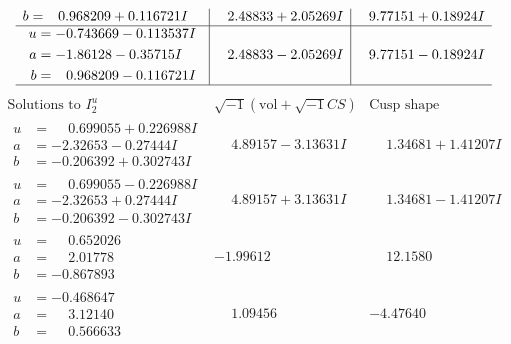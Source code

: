 \documentclass[1p]{elsarticle_modified}
\theoremstyle{definition}
\newcommand{\I}{\sqrt{-1}}
\begin{document}
$$\begin{array}{c|c|c}
\begin{aligned}
b &= \phantom{-}0.968209 + 0.116721 I\end{aligned}
 & \phantom{-}2.48833 + 2.05269 I & \phantom{-}9.77151 + 0.18924 I \\ \hline\begin{aligned}
u &= -0.743669 - 0.113537 I \\
a &= -1.86128 - 0.35715 I \\
b &= \phantom{-}0.968209 - 0.116721 I\end{aligned}
 & \phantom{-}2.48833 - 2.05269 I & \phantom{-}9.77151 - 0.18924 I\\
 \hline 
 \end{array}$$\newpage$$\begin{array}{c|c|c}  
\text{Solutions to }I^u_{2}& \I (\text{vol} + \sqrt{-1}CS) & \text{Cusp shape}\\
 \hline 
\begin{aligned}
u &= \phantom{-}0.699055 + 0.226988 I \\
a &= -2.32653 - 0.27444 I \\
b &= -0.206392 + 0.302743 I\end{aligned}
 & \phantom{-}4.89157 - 3.13631 I & \phantom{-}1.34681 + 1.41207 I \\ \hline\begin{aligned}
u &= \phantom{-}0.699055 - 0.226988 I \\
a &= -2.32653 + 0.27444 I \\
b &= -0.206392 - 0.302743 I\end{aligned}
 & \phantom{-}4.89157 + 3.13631 I & \phantom{-}1.34681 - 1.41207 I \\ \hline\begin{aligned}
u &= \phantom{-}0.652026\phantom{ +0.000000I} \\
a &= \phantom{-}2.01778\phantom{ +0.000000I} \\
b &= -0.867893\phantom{ +0.000000I}\end{aligned}
 & -1.99612\phantom{ +0.000000I} & \phantom{-}12.1580\phantom{ +0.000000I} \\ \hline\begin{aligned}
u &= -0.468647\phantom{ +0.000000I} \\
a &= \phantom{-}3.12140\phantom{ +0.000000I} \\
b &= \phantom{-}0.566633\phantom{ +0.000000I}\end{aligned}
 & \phantom{-}1.09456\phantom{ +0.000000I} & -4.47640\phantom{ +0.000000I} \\ \hline\begin{aligned}

\end{aligned}
\end{array}$$
\end{document}
